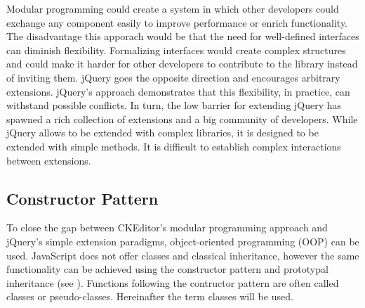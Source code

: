 Modular programming could create a system in which other developers could exchange any component easily to improve performance or enrich functionality. The disadvantage this apporach would be that the need for well-defined interfaces can diminish flexibility. Formalizing interfaces would create complex structures and could make it harder for other developers to contribute to the library instead of inviting them. jQuery goes the opposite direction and encourages arbitrary extensions. jQuery's approach demonstrates that this flexibility, in practice, can withstand possible conflicts. In turn, the low barrier for extending jQuery has spawned a rich collection of extensions and a big community of developers. While jQuery allows to be extended with complex libraries, it is designed to be extended with simple methods. It is difficult to establish complex interactions between extensions.



\subsection{Constructor Pattern} To close the gap between CKEditor's modular programming approach and jQuery's simple extension paradigms, object-oriented programming (OOP) can be used. JavaScript does not offer classes and classical inheritance, however the same functionality can be achieved using the constructor pattern and prototypal inheritance (see ). Functions following the contructor pattern are often called classes or pseudo-classes. Hereinafter the term classes will be used.

%
%
%



